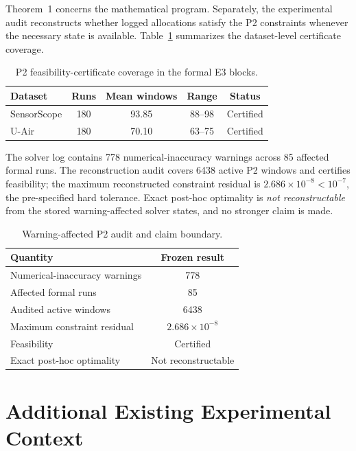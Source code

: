 \documentclass[letterpaper,journal]{IEEEtran}
\begin{document}
Theorem~1 concerns the mathematical program.  Separately, the
experimental audit reconstructs whether logged allocations satisfy the P2
constraints whenever the necessary state is available.  Table~\ref{tab:app_p2_coverage}
summarizes the dataset-level certificate coverage.

\begin{table}[htbp]
\centering
\caption{P2 feasibility-certificate coverage in the formal E3 blocks.}
\label{tab:app_p2_coverage}
\footnotesize
\setlength{\tabcolsep}{4pt}
\begin{tabular}{lcccc}
\toprule
Dataset & Runs & Mean windows & Range & Status\\
\midrule
SensorScope & 180 & 93.85 & 88--98 & Certified \\
U-Air & 180 & 70.10 & 63--75 & Certified \\
\bottomrule
\end{tabular}
\end{table}

The solver log contains 778 numerical-inaccuracy warnings across
85 affected formal runs.  The reconstruction audit covers
6438 active P2 windows and certifies feasibility; the maximum
reconstructed constraint residual is
$2.686\times10^{-8}<10^{-7}$, the pre-specified hard tolerance.  Exact post-hoc
optimality is \emph{not reconstructable} from the stored warning-affected
solver states, and no stronger claim is made.

\begin{table}[htbp]
\centering
\caption{Warning-affected P2 audit and claim boundary.}
\label{tab:app_p2_warning_audit}
\footnotesize
\setlength{\tabcolsep}{5pt}
\begin{tabular}{lc}
\toprule
Quantity & Frozen result\\
\midrule
Numerical-inaccuracy warnings & 778\\
Affected formal runs & 85\\
Audited active windows & 6438\\
Maximum constraint residual & $2.686\times10^{-8}$\\
Feasibility & Certified\\
Exact post-hoc optimality & Not reconstructable\\
\bottomrule
\end{tabular}
\end{table}


\section{Additional Existing Experimental Context}
\label{app:additional_context}
\end{document}
